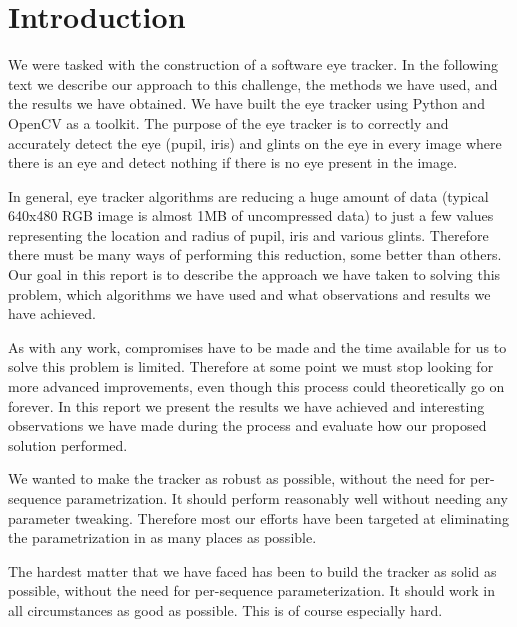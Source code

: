 \pagebreak
\section{Introduction}

We were tasked with the construction of a software eye tracker. In the following text we describe our approach to this challenge, the methods we have used, and the results we have obtained.  We have built the eye tracker using Python and OpenCV as a toolkit. The purpose of the eye tracker is to correctly and accurately detect the eye (pupil, iris) and glints on the eye in every image where there is an eye and detect nothing if there is no eye present in the image.

In general, eye tracker algorithms are reducing a huge amount of data (typical 640x480 RGB image is almost 1MB of uncompressed data) to just a few values representing the location and radius of pupil, iris and various glints. Therefore there must be many ways of performing this reduction, some better than others. Our goal in this report is to describe the approach we have taken to solving this problem, which algorithms we have used and what observations and results we have achieved.

As with any work, compromises have to be made and the time available for us to solve this problem is limited. Therefore at some point we must stop looking for more advanced improvements, even though this process could theoretically go on forever. In this report we present the results we have achieved and interesting observations we have made during the process and evaluate how our proposed solution performed.

We wanted to make the tracker as robust as possible, without the need for per-sequence parametrization. It should perform reasonably well without needing any parameter tweaking. Therefore most our efforts have been targeted at eliminating the parametrization in as many places as possible.

The hardest matter that we have faced has been to build the tracker as solid as possible, without the need for per-sequence parameterization. It should work in all circumstances as good as possible. This is of course especially hard.
